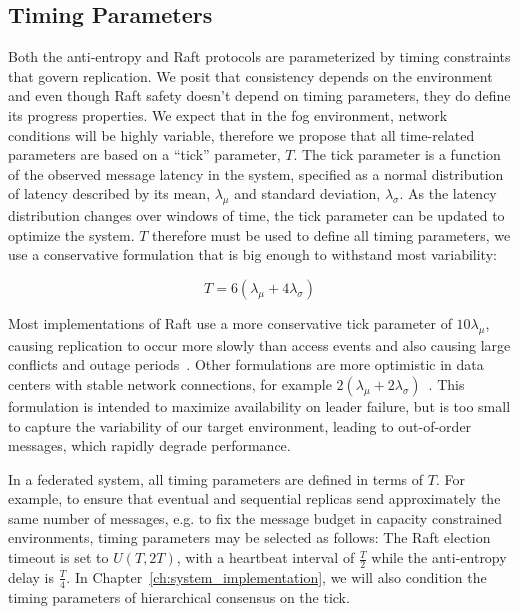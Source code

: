 \subsection{Timing Parameters}
\label{ch04_timing}

Both the anti-entropy and Raft protocols are parameterized by timing constraints that govern replication.
We posit that consistency depends on the environment and even though Raft safety doesn't depend on timing parameters, they do define its progress properties.
We expect that in the fog environment, network conditions will be highly variable, therefore we propose that all time-related parameters are based on a ``tick'' parameter, $T$.
The tick parameter is a function of the observed message latency in the system, specified as a normal distribution of latency described by its mean, $\lambda_\mu$ and standard deviation, $\lambda_\sigma$.
As the latency distribution changes over windows of time, the tick parameter can be updated to optimize the system.
$T$ therefore must be used to define all timing parameters, we use a conservative formulation that is big enough to withstand most variability:

\renewcommand{\baselinestretch}{1}
\begin{equation}
    T = 6(\lambda_{\mu} + 4\lambda_{\sigma})
    \label{eq:tick_parameter}
\end{equation}
\renewcommand{\baselinestretch}{2}

Most implementations of Raft use a more conservative tick parameter of $10\lambda_\mu$, causing replication to occur more slowly than access events and also causing large conflicts and outage periods~\cite{raft,etcd_raft}.
Other formulations are more optimistic in data centers with stable network connections, for example $2\left(\lambda_{\mu} + 2\lambda_{\sigma}\right)$~\cite{raft_refloated}.
This formulation is intended to maximize availability on leader failure, but is too small to capture the variability of our target environment, leading to out-of-order messages, which rapidly degrade performance.

In a federated system, all timing parameters are defined in terms of $T$.
For example, to ensure that eventual and sequential replicas send approximately the same number of messages, e.g. to fix the message budget in capacity constrained environments, timing parameters may be selected as follows:
The Raft election timeout is set to $U(T,2T)$, with a heartbeat interval of $\frac{T}{2}$ while the anti-entropy delay is $\frac{T}{4}$.
In Chapter~\ref{ch:system_implementation}, we will also condition the timing parameters of hierarchical consensus on the tick.

